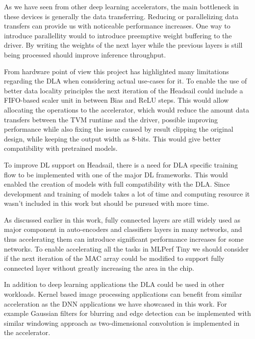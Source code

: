 \documentclass[12pt,a4paper,english
]{tunithesis}
\begin{document}
As we have seen from other deep learning accelerators, the main bottleneck in these devices is generally the data transferring. Reducing or parallelizing data transfers can provide us with noticeable performance increases. One way to introduce parallellity would to introduce preemptive weight buffering to the driver. By writing the weights of the next layer while the previous layers is still being processed should improve inference throughput.

From hardware point of view this project has highlighted many limitations regarding the DLA when considering actual use-cases for it. To enable the use of better data locality principles the next iteration of the Headsail could include a FIFO-based scaler unit in between Bias and ReLU steps. This would allow allocating the  operations to the accelerator, which would reduce the amount data transfers between the TVM runtime and the driver, possible improving performance while also fixing the issue caused by result clipping the original design, while keeping the output width as 8-bits. This would give better compatibility with pretrained models.

To improve DL support on Headsail, there is a need for DLA specific training flow to be implemented with one of the major DL frameworks. This would enabled the creation of models with full compatibility with the DLA. Since development and training of models takes a lot of time and computing resource it wasn't included in this work but should be pursued with more time.

As discussed earlier in this work, fully connected layers are still widely used as major component in auto-encoders and classifiers layers in many networks, and thus accelerating them can introduce significant performance increases for some networks. To enable accelerating all the tasks in MLPerf Tiny we should consider if the next iteration of the MAC array could be modified to support fully connected layer without greatly increasing the area in the chip.

In addition to deep learning applications the DLA could be used in other workloads. Kernel based image processing applications can benefit from similar acceleration as the DNN applications we have showcased in this work. For example Gaussian filters for blurring and edge detection can be implemented with similar windowing approach as two-dimensional convolution is implemented in the accelerator.



%
%
\newpage
\end{document}
